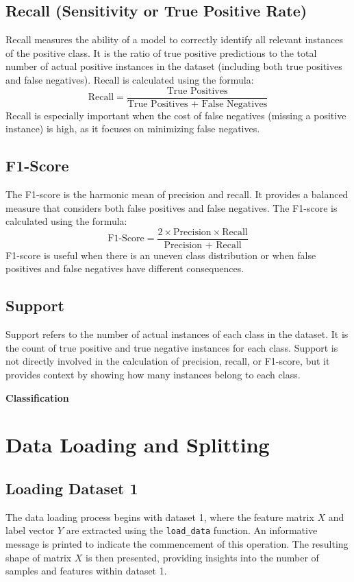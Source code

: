 \documentclass{article}
\begin{document}
\begin{titlepage}
  \subsection{Recall (Sensitivity or True Positive Rate)}
  Recall measures the ability of a model to correctly identify all relevant instances of the positive class. It is the ratio of true positive predictions to the total number of actual positive instances in the dataset (including both true positives and false negatives). Recall is calculated using the formula:
  \[
    \text{Recall} = \frac{\text{True Positives}}{\text{True Positives + False Negatives}}
  \]
  Recall is especially important when the cost of false negatives (missing a positive instance) is high, as it focuses on minimizing false negatives.

  \subsection{F1-Score}
  The F1-score is the harmonic mean of precision and recall. It provides a balanced measure that considers both false positives and false negatives. The F1-score is calculated using the formula:
  \[
    \text{F1-Score} = \frac{2 \times \text{Precision} \times \text{Recall}}{\text{Precision + Recall}}
  \]
  F1-score is useful when there is an uneven class distribution or when false positives and false negatives have different consequences.

  \subsection{Support}
  Support refers to the number of actual instances of each class in the dataset. It is the count of true positive and true negative instances for each class. Support is not directly involved in the calculation of precision, recall, or F1-score, but it provides context by showing how many instances belong to each class.

  \begin{center}
    {\Huge\bfseries Classification\par}
  \end{center}
  \vspace{0.5cm}

  \section{Data Loading and Splitting}

  \subsection{Loading Dataset 1}
  The data loading process begins with dataset 1, where the feature matrix \(X\) and label vector \(Y\) are extracted using the \texttt{load\_data} function. An informative message is printed to indicate the commencement of this operation. The resulting shape of matrix \(X\) is then presented, providing insights into the number of samples and features within dataset 1.


\end{titlepage}
\end{document}
